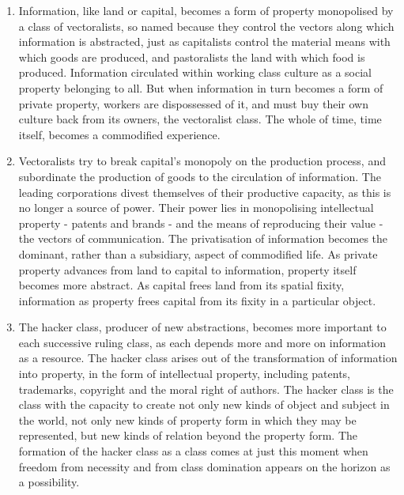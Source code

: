 \documentclass[letterpaper,12pt,english]{sphinxmanual}
\begin{document}
\begin{enumerate}
\item {} 
Information, like land or capital, becomes a form of property monopolised by a class of vectoralists, so named because they control the vectors along which information is abstracted, just as capitalists control the material means with which goods are produced, and pastoralists the land with which food is produced. Information circulated within working class culture as a social property belonging to all. But when information in turn becomes a form of private property, workers are dispossessed of it, and must buy their own culture back from its owners, the vectoralist class. The whole of time, time itself, becomes a commodified experience.

\item {} 
Vectoralists try to break capital's monopoly on the production process, and subordinate the production of goods to the circulation of information. The leading corporations divest themselves of their productive capacity, as this is no longer a source of power. Their power lies in monopolising intellectual property - patents and brands - and the means of reproducing their value - the vectors of communication. The privatisation of information becomes the dominant, rather than a subsidiary, aspect of commodified life. As private property advances from land to capital to information, property itself becomes more abstract. As capital frees land from its spatial fixity, information as property frees capital from its fixity in a particular object.

\item {} 
The hacker class, producer of new abstractions, becomes more important to each successive ruling class, as each depends more and more on information as a resource. The hacker class arises out of the transformation of information into property, in the form of intellectual property, including patents, trademarks, copyright and the moral right of authors. The hacker class is the class with the capacity to create not only new kinds of object and subject in the world, not only new kinds of property form in which they may be represented, but new kinds of relation beyond the property form. The formation of the hacker class as a class comes at just this moment when freedom from necessity and from class domination appears on the horizon as a possibility.

\end{enumerate}
\end{document}
